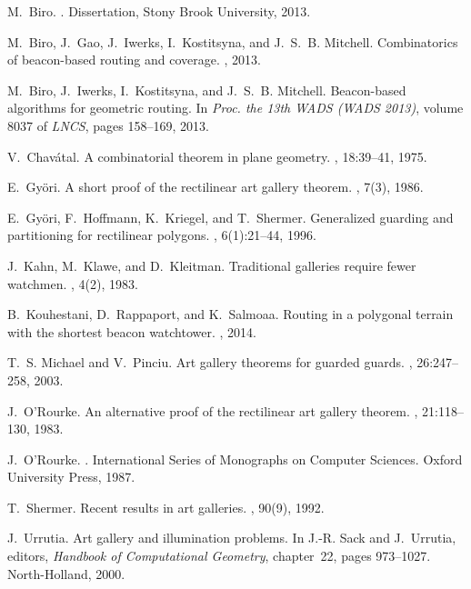 \documentclass[11pt]{article}
\theoremstyle{definition}
\begin{document}
\begin{thebibliography}{10}

M.~Biro.
.
\newblock Dissertation, Stony Brook University, 2013.

M.~Biro, J.~Gao, J.~Iwerks, I.~Kostitsyna, and J.~S.~B. Mitchell.
\newblock Combinatorics of beacon-based routing and coverage.
, 2013.

M.~Biro, J.~Iwerks, I.~Kostitsyna, and J.~S.~B. Mitchell.
\newblock Beacon-based algorithms for geometric routing.
\newblock In {\em Proc. the 13th WADS (WADS 2013)}, volume 8037 of {\em LNCS},
  pages 158--169, 2013.

V.~Chav\'{a}tal.
\newblock A combinatorial theorem in plane geometry.
, 18:39--41, 1975.

E.~Gy\"{o}ri.
\newblock A short proof of the rectilinear art gallery theorem.
, 7(3), 1986.

E.~Gy\"{o}ri, F.~Hoffmann, K.~Kriegel, and T.~Shermer.
\newblock Generalized guarding and partitioning for rectilinear polygons.
, 6(1):21--44, 1996.

J.~Kahn, M.~Klawe, and D.~Kleitman.
\newblock Traditional galleries require fewer watchmen.
, 4(2), 1983.

B.~Kouhestani, D.~Rappaport, and K.~Salmoaa.
\newblock Routing in a polygonal terrain with the shortest beacon watchtower.
, 2014.

T.~S. Michael and V.~Pinciu.
\newblock Art gallery theorems for guarded guards.
, 26:247--258, 2003.

J.~O'Rourke.
\newblock An alternative proof of the rectilinear art gallery theorem.
, 21:118--130, 1983.

J.~O'Rourke.
.
\newblock International Series of Monographs on Computer Sciences. Oxford
  University Press, 1987.

T.~Shermer.
\newblock Recent results in art galleries.
, 90(9), 1992.

J.~Urrutia.
\newblock Art gallery and illumination problems.
\newblock In J.-R. Sack and J.~Urrutia, editors, {\em Handbook of Computational
  Geometry}, chapter~22, pages 973--1027. North-Holland, 2000.

\end{thebibliography}
\end{document}
